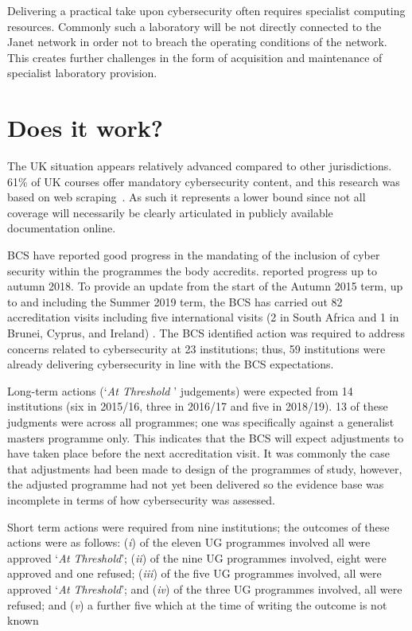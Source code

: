 \documentclass[sigconf]{acmart}
\begin{document}
Delivering a practical take upon cybersecurity often requires specialist computing resources. Commonly such a laboratory will be not directly connected to the Janet network in order not to breach the operating conditions of the network. This creates further challenges in the form of acquisition and maintenance of specialist laboratory provision.

\section {Does it work?}	
The UK situation appears relatively advanced compared to other jurisdictions. 61\% of UK courses offer mandatory cybersecurity content, and this research was based on web scraping~\cite[Table 1]{Ruiz2019a}. As such it represents a lower bound since not all coverage will necessarily be clearly articulated in publicly available documentation online.

BCS have reported good progress in the mandating of the inclusion of cyber security within the programmes the body accredits. \cite{Cricketal2019} reported progress up to  autumn 2018. To provide an update from the start of the Autumn 2015 term, up to and including the Summer 2019 term, the BCS has carried out 82 accreditation visits including five international visits (2 in South Africa and 1 in Brunei, Cyprus, and Ireland) . The BCS identified action was required to address concerns related to cybersecurity at 23 institutions; thus, 59 institutions were already delivering cybersecurity in line with the BCS expectations.

Long-term actions (`{\emph{At Threshold }}' judgements) were expected from 14 institutions (six in 2015/16, three in 2016/17 and five in 2018/19). 13 of these judgments were across all programmes; one was specifically against a generalist masters programme only. This indicates that the BCS will expect adjustments to have taken place before the next accreditation visit. It was commonly the case that adjustments had been made to design of the programmes of study, however, the adjusted programme had not yet been delivered so the evidence base was incomplete in terms of how cybersecurity was assessed.

Short term actions were required from nine institutions; the outcomes of these actions were as follows: ({\emph{i}}) of the eleven UG programmes involved all were approved `{\emph{At Threshold}}'; ({\emph{ii}}) of the nine UG programmes involved, eight were approved and one refused; ({\emph{iii}}) of the five UG programmes involved, all were approved `{\emph{At Threshold}}'; and ({\emph{iv}}) of the three UG programmes involved, all were refused; and ({\emph{v}}) a further five which at the time of writing the outcome is not known
\end{document}
